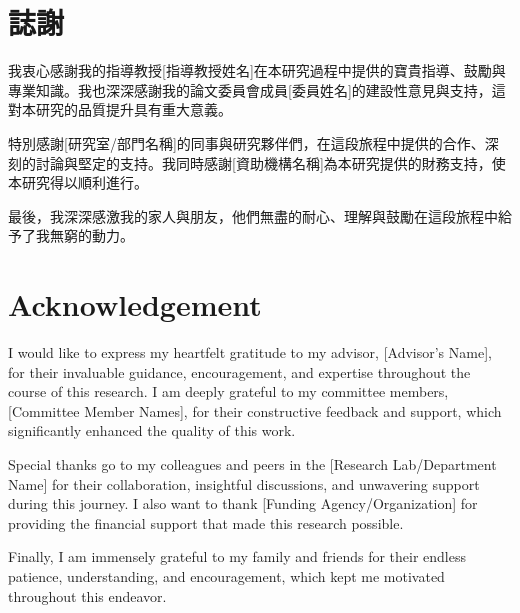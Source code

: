 \chapter*{\hfill 誌謝\hfill}
我衷心感謝我的指導教授[指導教授姓名]在本研究過程中提供的寶貴指導、鼓勵與專業知識。我也深深感謝我的論文委員會成員[委員姓名]的建設性意見與支持，這對本研究的品質提升具有重大意義。

特別感謝[研究室/部門名稱]的同事與研究夥伴們，在這段旅程中提供的合作、深刻的討論與堅定的支持。我同時感謝[資助機構名稱]為本研究提供的財務支持，使本研究得以順利進行。

最後，我深深感激我的家人與朋友，他們無盡的耐心、理解與鼓勵在這段旅程中給予了我無窮的動力。
\clearpage

\chapter*{\hfill Acknowledgement\hfill}
I would like to express my heartfelt gratitude to my advisor, [Advisor's Name], for their invaluable guidance, encouragement, and expertise throughout the course of this research. I am deeply grateful to my committee members, [Committee Member Names], for their constructive feedback and support, which significantly enhanced the quality of this work.

Special thanks go to my colleagues and peers in the [Research Lab/Department Name] for their collaboration, insightful discussions, and unwavering support during this journey. I also want to thank [Funding Agency/Organization] for providing the financial support that made this research possible.

Finally, I am immensely grateful to my family and friends for their endless patience, understanding, and encouragement, which kept me motivated throughout this endeavor.
\clearpage

